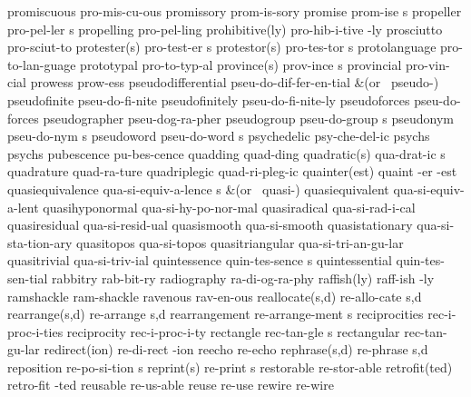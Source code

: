 \1 promiscuous		pro-mis-cu-ous		%
\1 promissory		prom-is-sory		%
\5 promise		prom-ise s		%
\5 propeller		pro-pel-ler s		%
\1 propelling		pro-pel-ling		%
\2 prohibitive(ly)	pro-hib-i-tive -ly
\1 prosciutto		pro-sciut-to
\2 protester(s)		pro-test-er s
\2 protestor(s)		pro-tes-tor s
\1 protolanguage	pro-to-lan-guage     %
\1 prototypal		pro-to-typ-al
\2 province(s)		prov-ince s		%
\1 provincial		pro-vin-cial		%
\1 prowess		prow-ess		%
\1 pseudodifferential	pseu-do-dif-fer-en-tial
\tabalign {}		&\null\quad (or \ pseudo-{}) \cr
\1 pseudofinite 	pseu-do-fi-nite
\1 pseudofinitely	pseu-do-fi-nite-ly
\1 pseudoforces 	pseu-do-forces
\1 pseudographer	pseu-dog-ra-pher	%
\5 pseudogroup		pseu-do-group s		%
\5 pseudonym		pseu-do-nym s
\5 pseudoword		pseu-do-word s
\1 psychedelic		psy-che-del-ic
\1 psychs		psychs
\1 pubescence		pu-bes-cence
\1 quadding		quad-ding
\2 quadratic(s)		qua-drat-ic s
\1 quadrature		quad-ra-ture
\1 quadriplegic		quad-ri-pleg-ic
\3 quainter(est)	quaint -er -est
\5 quasiequivalence	qua-si-equiv-a-lence s
\tabalign {}		&\null\quad (or \ quasi-{}) \cr
\1 quasiequivalent	qua-si-equiv-a-lent	%
\1 quasihyponormal	qua-si-hy-po-nor-mal
\1 quasiradical 	qua-si-rad-i-cal
\1 quasiresidual	qua-si-resid-ual
\1 quasismooth		qua-si-smooth
\1 quasistationary	qua-si-sta-tion-ary
\1 quasitopos		qua-si-topos
\1 quasitriangular	qua-si-tri-an-gu-lar
\1 quasitrivial		qua-si-triv-ial		%
\5 quintessence		quin-tes-sence s
\1 quintessential	quin-tes-sen-tial
\1 rabbitry		rab-bit-ry
\1 radiography		ra-di-og-ra-phy
\2 raffish(ly)		raff-ish -ly
\1 ramshackle		ram-shackle
\1 ravenous		rav-en-ous
\NewWordtrue
\2 reallocate(s,d)	re-allo-cate s,d	%
\NewWordtrue
\2 rearrange(s,d)	re-arrange s,d		%
\5 rearrangement	re-arrange-ment s
\1 reciprocities	rec-i-proc-i-ties
\1 reciprocity		rec-i-proc-i-ty
\5 rectangle		rec-tan-gle s
\1 rectangular		rec-tan-gu-lar
\2 redirect(ion)	re-di-rect -ion		%
\1 reecho		re-echo
\2 rephrase(s,d)	re-phrase s,d		%
\5 reposition		re-po-si-tion s		%
\2 reprint(s)		re-print s
\1 restorable		re-stor-able
\2 retrofit(ted)	retro-fit -ted
\1 reusable		re-us-able		%
\1 reuse		re-use			%
\1 rewire		re-wire 		%
